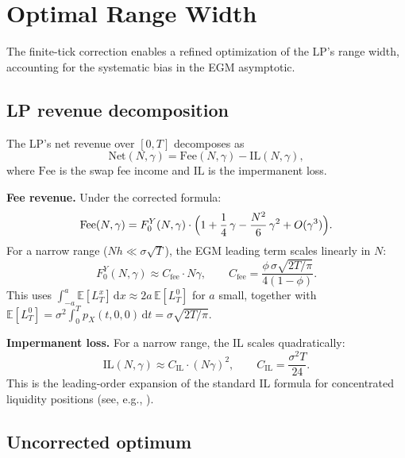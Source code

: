 \documentclass[11pt]{article}
\theoremstyle{definition}
\theoremstyle{remark}
\newcommand{\E}{\mathbb{E}}
\newcommand{\dd}{\,\mathrm{d}}
\newcommand{\IL}{\mathrm{IL}}
\begin{document}
\section{Optimal Range Width}\label{sec:optimal}

The finite-tick correction enables a refined optimization of the LP's
range width, accounting for the systematic bias in the EGM asymptotic.

\subsection{LP revenue decomposition}

The LP's net revenue over $[0, T]$ decomposes as
\begin{equation}\label{eq:net_revenue}
\mathrm{Net}(N, \gamma) = \mathrm{Fee}(N, \gamma)
- \IL(N, \gamma),
\end{equation}
where $\mathrm{Fee}$ is the swap fee income and $\IL$ is the
impermanent loss.

\textbf{Fee revenue.} Under the corrected formula:
\begin{equation}\label{eq:corrected_fee}
\mathrm{Fee}(N, \gamma) = F_0^Y(N, \gamma)
\cdot \Bigl(1 + \frac{1}{4}\,\gamma
- \frac{N^2}{6}\,\gamma^2 + O(\gamma^3)\Bigr).
\end{equation}
For a narrow range ($Nh \ll \sigma\sqrt{T}$), the EGM leading term
scales linearly in $N$:
\begin{equation}\label{eq:F0_narrow}
F_0^Y(N, \gamma) \approx C_{\mathrm{fee}} \cdot N\gamma,
\qquad C_{\mathrm{fee}} = \frac{\phi\,\sigma\sqrt{2T/\pi}}
{4(1 - \phi)}.
\end{equation}
This uses $\int_{-a}^a \E[L^x_T]\dd x \approx 2a\,\E[L^0_T]$ for
$a$ small, together with
$\E[L^0_T] = \sigma^2\int_0^T p_X(t,0,0)\dd t
= \sigma\sqrt{2T/\pi}$.

\textbf{Impermanent loss.} For a narrow range, the IL scales
quadratically:
\begin{equation}\label{eq:IL}
\IL(N, \gamma) \approx C_{\IL} \cdot (N\gamma)^2,
\qquad C_{\IL} = \frac{\sigma^2 T}{24}.
\end{equation}
This is the leading-order expansion of the standard IL formula for
concentrated liquidity positions (see, e.g., \citealt{ClarkHassani2023}).

\subsection{Uncorrected optimum}
\end{document}
